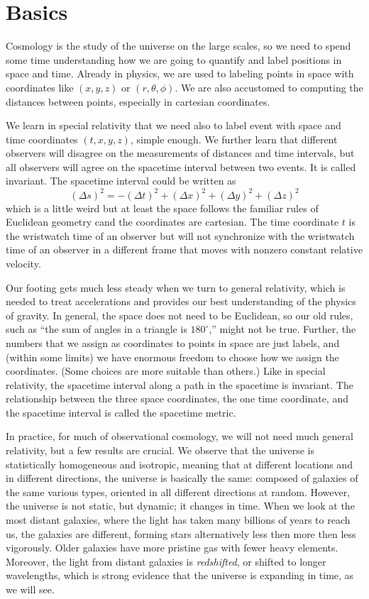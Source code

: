 \chapter{Basics}

Cosmology is the study of the universe on the large scales, so we need to spend some time understanding how we are going to quantify and label positions in space and time.  Already in physics, we are used to labeling points in space with coordinates like $(x,y,z)$ or $(r,\theta,\phi)$.  We are also accustomed to computing the distances between points, especially in cartesian coordinates.

We learn in special relativity that we need also to label event with space and time coordinates $(t,x,y,z)$, simple enough.  We further learn that different observers will disagree on the measurements of distances and time intervals, but all observers will agree on the spacetime interval between two events.  It is called invariant.  The spacetime interval could be written as
\begin{equation}
  (\Delta s)^2 = -(\Delta t)^2 +  (\Delta x)^2 + (\Delta y)^2 + (\Delta z)^2
\end{equation}
which is a little weird but at least the space follows the familiar rules of Euclidean geometry cand the coordinates are cartesian.  The time coordinate $t$ is the wristwatch time of an observer but will not synchronize with the wristwatch time of an observer in a different frame that moves with nonzero constant relative velocity.

Our footing gets much less steady when we turn to general relativity, which is needed to treat accelerations and provides our best understanding of the physics of gravity.  In general, the space does not need to be Euclidean, so our old rules, such as ``the sum of angles in a triangle is $180^\circ$,'' might not be true.  Further, the numbers that we assign as coordinates to points in space are just labels, and (within some limits) we have enormous freedom to choose how we assign the coordinates.  (Some choices are more suitable than others.)  Like in special relativity, the spacetime interval along a path in the spacetime is invariant.  The relationship between the three space coordinates, the one time coordinate, and the spacetime interval is called the spacetime metric.

In practice, for much of observational cosmology, we will not need much general relativity, but a few results are crucial.  We observe that the universe is statistically homogeneous and isotropic, meaning that at different locations and in different directions, the universe is basically the same: composed of galaxies of the same various types, oriented in all different directions at random.  However, the universe is not static, but dynamic; it changes in time.  When we look at the most distant galaxies, where the light has taken many billions of years to reach us, the galaxies are different, forming stars alternatively less then more then less vigorously.  Older galaxies have more pristine gas with fewer heavy elements.  Moreover, the light from distant galaxies is \textit{redshifted}, or shifted to longer wavelengths, which is strong evidence that the universe is expanding in time, as we will see.

